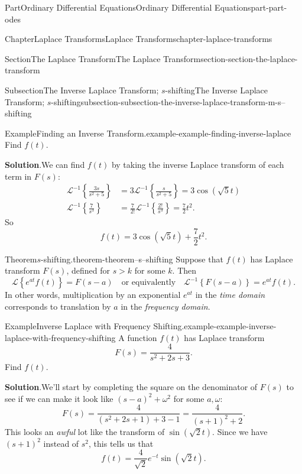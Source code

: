 \documentclass[twoside,10pt,]{book}
\newcommand{\blocktitlefont}{\relax}
\numberwithin{equation}{part}
\newcommand{\Laplace}[1]{\mathcal{L}\set{#1}}
\newcommand{\iLaplace}[1]{\mathcal{L}^{-1}\set{#1}}
\newcommand{\set}[1]{\left\{ #1 \right\}}
\newcommand{\qq}[1]{\quad\text{#1}\quad}
\newcommand{\gt}{>}
\begin{document}
\begin{partptx}{Part}{Ordinary Differential Equations}{}{Ordinary Differential Equations}{}{}{part-part-odes}
\begin{chapterptx}{Chapter}{Laplace Transforms}{}{Laplace Transforms}{}{}{chapter-laplace-transforms}
\begin{sectionptx}{Section}{The Laplace Transform}{}{The Laplace Transform}{}{}{section-section-the-laplace-transform}
\begin{subsectionptx}{Subsection}{The Inverse Laplace Transform; \(s\)-shifting}{}{The Inverse Laplace Transform; \(s\)-shifting}{}{}{subsection-subsection-the-inverse-laplace-transform-m-s--shifting}
\begin{example}{Example}{Finding an Inverse Transform.}{example-example-finding-inverse-laplace}
\begin{equation*}
\end{equation*}
Find \(f(t)\).%
\par\smallskip%
\noindent\textbf{\blocktitlefont Solution}.\hypertarget{solution-example-finding-inverse-laplace-c}{}\quad{}We can find \(f(t)\) by taking the inverse Laplace transform of each term in \(F(s)\):%
\begin{align*}
\iLaplace{\frac{3s}{s^{2}+5}} &= 3\iLaplace{\frac{s}{s^{2}+5}} = 3\cos(\sqrt{5}t)\\
\iLaplace{\frac{7}{s^{3}}} &= \frac{7}{2!}\iLaplace{\frac{2!}{s^{3}}} = \frac{7}{2}t^{2}\text{.}
\end{align*}
So%
\begin{equation*}
f(t) = 3\cos(\sqrt{5}t)+\frac{7}{2}t^{2}.
\end{equation*}
%
\end{example}
\begin{theorem}{Theorem}{\(s\)-shifting.}{}{theorem-theorem--s--shifting}%
Suppose that \(f(t)\) has Laplace transform \(F(s)\), defined for \(s\gt k\) for some \(k\). Then%
\begin{equation*}
\Laplace{e^{at}f(t)} = F(s-a)\qq{or equivalently} \iLaplace{F(s-a)} = e^{at}f(t).
\end{equation*}
In other words, multiplication by an exponential \(e^{at}\) in the \emph{time domain} corresponds to translation by \(a\) in the \emph{frequency domain}.%
\end{theorem}
\begin{example}{Example}{Inverse Laplace with Frequency Shifting.}{example-example-inverse-laplace-with-frequency-shifting}%
A function \(f(t)\) has Laplace transform%
\begin{equation*}
F(s) = \frac{4}{s^{2}+2s+3}.
\end{equation*}
Find \(f(t)\).%
\par\smallskip%
\noindent\textbf{\blocktitlefont Solution}.\hypertarget{solution-example-inverse-laplace-with-frequency-shifting-c}{}\quad{}We'll start by completing the square on the denominator of \(F(s)\) to see if we can make it look like \((s-a)^{2}+\omega^{2}\) for some \(a,\omega\):%
\begin{equation*}
F(s) = \frac{4}{(s^{2}+2s+1)+3-1} = \frac{4}{(s+1)^{2}+2}.
\end{equation*}
This looks an \emph{awful} lot like the transform of \(\sin(\sqrt{2}t)\). Since we have \((s+1)^{2}\) instead of \(s^{2}\), this tells us that%
\begin{equation*}
f(t) = \frac{4}{\sqrt{2}}e^{-t}\sin(\sqrt{2}t).

\end{equation*}
\end{example}
\end{subsectionptx}
\end{sectionptx}
\end{chapterptx}
\end{partptx}
\end{document}
